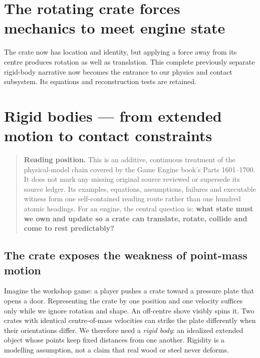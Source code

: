 \section{The rotating crate forces mechanics to meet engine state}\label{06-engine-ii-ch033-the-rotating-crate-forces-mechanics-to-meet-engine-state}

The crate now has location and identity, but applying a force away from its centre produces rotation as well as translation. This complete previously separate rigid-body narrative now becomes the entrance to our physics and contact subsystem. Its equations and reconstruction tests are retained.

\section{Rigid bodies --- from extended motion to contact constraints}\label{06-engine-ii-ch033-rigid-bodies-from-extended-motion-to-contact-constraints}

\begin{quote}
\textbf{Reading position.} This is an additive, continuous treatment of the physical-model chain covered by the Game Engine book's Parts 1601--1700. It does not mark any missing original source reviewed or supersede its source ledger. Its examples, equations, assumptions, failures and executable witness form one self-contained reading route rather than one hundred atomic headings. For an engine, the central question is: \textbf{what state must we own and update so a crate can translate, rotate, collide and come to rest predictably?}
\end{quote}

\subsection{The crate exposes the weakness of point-mass motion}\label{06-engine-ii-ch033-the-crate-exposes-the-weakness-of-point-mass-motion}

Imagine the workshop game: a player pushes a crate toward a pressure plate that opens a door. Representing the crate by one position and one velocity suffices only while we ignore rotation and shape. An off-centre shove visibly spins it. Two crates with identical centre-of-mass velocities can strike the plate differently when their orientations differ. We therefore need a \emph{rigid body}: an idealized extended object whose points keep fixed distances from one another. Rigidity is a modelling assumption, not a claim that real wood or steel never deforms.

